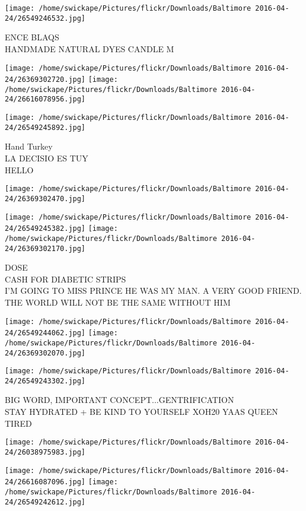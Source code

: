 \documentclass[10pt,letterpaper]{article}
\begin{document}
\vspace{0.25in}
\texttt{[image: /home/swickape/Pictures/flickr/Downloads/Baltimore 2016-04-24/26549246532.jpg]}

ENCE BLAQS\\
HANDMADE NATURAL DYES CANDLE M
\pagebreak

\texttt{[image: /home/swickape/Pictures/flickr/Downloads/Baltimore 2016-04-24/26369302720.jpg]}
\texttt{[image: /home/swickape/Pictures/flickr/Downloads/Baltimore 2016-04-24/26616078956.jpg]}

\texttt{[image: /home/swickape/Pictures/flickr/Downloads/Baltimore 2016-04-24/26549245892.jpg]}

Hand Turkey\\
LA DECISIO ES TUY\\
HELLO
\pagebreak

\texttt{[image: /home/swickape/Pictures/flickr/Downloads/Baltimore 2016-04-24/26369302470.jpg]}

\vspace{0.25in}
\texttt{[image: /home/swickape/Pictures/flickr/Downloads/Baltimore 2016-04-24/26549245382.jpg]}
\texttt{[image: /home/swickape/Pictures/flickr/Downloads/Baltimore 2016-04-24/26369302170.jpg]}

DOSE\\
CASH FOR DIABETIC STRIPS\\
I'M GOING TO MISS PRINCE HE WAS MY MAN.  A VERY GOOD FRIEND.  THE WORLD WILL NOT BE THE SAME WITHOUT HIM
\pagebreak

\texttt{[image: /home/swickape/Pictures/flickr/Downloads/Baltimore 2016-04-24/26549244062.jpg]}
\texttt{[image: /home/swickape/Pictures/flickr/Downloads/Baltimore 2016-04-24/26369302070.jpg]}

\vspace{0.25in}
\texttt{[image: /home/swickape/Pictures/flickr/Downloads/Baltimore 2016-04-24/26549243302.jpg]}

BIG WORD, IMPORTANT CONCEPT...GENTRIFICATION\\
STAY HYDRATED + BE KIND TO YOURSELF XOH20 YAAS QUEEN\\
TIRED
\pagebreak

\texttt{[image: /home/swickape/Pictures/flickr/Downloads/Baltimore 2016-04-24/26038975983.jpg]}

\vspace{0.25in}
\texttt{[image: /home/swickape/Pictures/flickr/Downloads/Baltimore 2016-04-24/26616087096.jpg]}
\texttt{[image: /home/swickape/Pictures/flickr/Downloads/Baltimore 2016-04-24/26549242612.jpg]}
\end{document}
